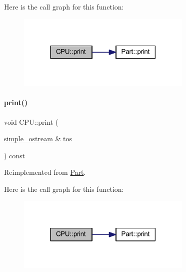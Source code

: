 Here is the call graph for this function\+:
\nopagebreak
\begin{figure}[H]
\begin{center}
\leavevmode
\includegraphics[width=237pt]{class_c_p_u_a0aea700bac0896b9e4434770737078d0_cgraph}
\end{center}
\end{figure}
\mbox{\label{class_c_p_u_a2f130a0263e32387554c128aedb6f9ed}} 
\paragraph{\texorpdfstring{print()}{print()}\hspace{0.1cm}{\footnotesize\ttfamily [3/4]}}
{\footnotesize\ttfamily void C\+P\+U\+::print (\begin{DoxyParamCaption}\item[{\mbox{\hyperlink{structsimple__ostream}{simple\+\_\+ostream}} \&}]{tos }\end{DoxyParamCaption}) const\hspace{0.3cm}{\ttfamily [virtual]}}



Reimplemented from \mbox{\hyperlink{class_part_aa602d876151b63db72cf8f666847a8cd}{Part}}.

Here is the call graph for this function\+:
\nopagebreak
\begin{figure}[H]
\begin{center}
\leavevmode
\includegraphics[width=237pt]{class_c_p_u_a2f130a0263e32387554c128aedb6f9ed_cgraph}
\end{center}
\end{figure}
\mbox{\label{class_c_p_u_aa2cf81d7f0005da72c7a99b1b9459c27}} 
